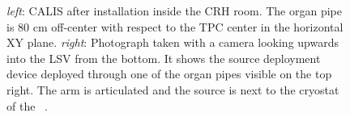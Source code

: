 \begin{figure}[htbp]
 \centering
{}
\caption{\textit{left}: CALIS after installation inside the CRH room. The organ pipe is 80 cm off-center with respect to the TPC center in the horizontal XY plane. \textit{right}: Photograph taken with a camera looking upwards into the LSV from the bottom. It shows the source deployment device deployed through one of the organ pipes visible on the top right. The arm is articulated and the source is next to the cryostat of the \lar\ \tpc.
\label{fig:CALIS_photos}}
\end{figure}







